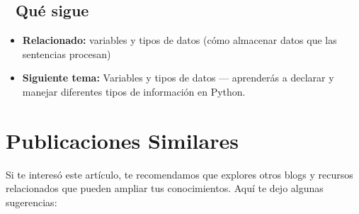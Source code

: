 \documentclass[
  doc,
  floatsintext,
  longtable,
  a4paper,
  nolmodern,
  notxfonts,
  notimes,
  12pt,
  colorlinks=true,linkcolor=blue,citecolor=blue,urlcolor=blue]{apa7}
\providecommand{\tightlist}{%
  \setlength{\itemsep}{0pt}\setlength{\parskip}{0pt}}
\begin{document}
\subsection{🔗 Qué sigue}\label{quuxe9-sigue}

\begin{itemize}
\tightlist
\item
  \textbf{Relacionado:} variables y tipos de datos (cómo almacenar datos
  que las sentencias procesan)
\item
  \textbf{Siguiente tema:} Variables y tipos de datos --- aprenderás a
  declarar y manejar diferentes tipos de información en Python.
\end{itemize}

\section{Publicaciones Similares}\label{publicaciones-similares}

Si te interesó este artículo, te recomendamos que explores otros blogs y
recursos relacionados que pueden ampliar tus conocimientos. Aquí te dejo
algunas sugerencias:
\end{document}
